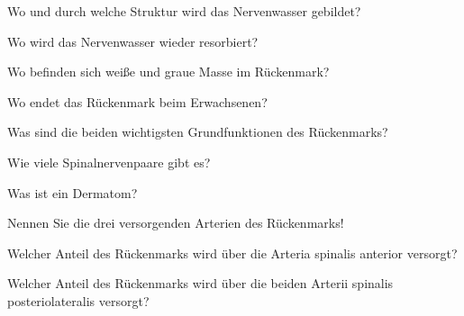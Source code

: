 \documentclass[10pt, a4paper]{exam}
\begin{document}
\begin{questions}
  \question Wo und durch welche Struktur wird das Nervenwasser gebildet?
  \begin{solution}

  \end{solution}

  \question Wo wird das Nervenwasser wieder resorbiert?
  \begin{solution}

  \end{solution}

  \question Wo befinden sich weiße und graue Masse im Rückenmark?
  \begin{solution}

  \end{solution}

  \question Wo endet das Rückenmark beim Erwachsenen?
  \begin{solution}

  \end{solution}

  \question Was sind die beiden wichtigsten Grundfunktionen des Rückenmarks?
  \begin{solution}

  \end{solution}

  \question Wie viele Spinalnervenpaare gibt es?
  \begin{solution}

  \end{solution}

  \question Was ist ein Dermatom?
  \begin{solution}

  \end{solution}

  \question Nennen Sie die drei versorgenden Arterien des Rückenmarks!
  \begin{solution}

  \end{solution}

  \question Welcher Anteil des Rückenmarks wird über die Arteria spinalis anterior versorgt?
  \begin{solution}

  \end{solution}

  \question Welcher Anteil des Rückenmarks wird über die beiden Arterii spinalis posteriolateralis versorgt?
  \begin{solution}

  \end{solution}


\end{questions}
\end{document}
